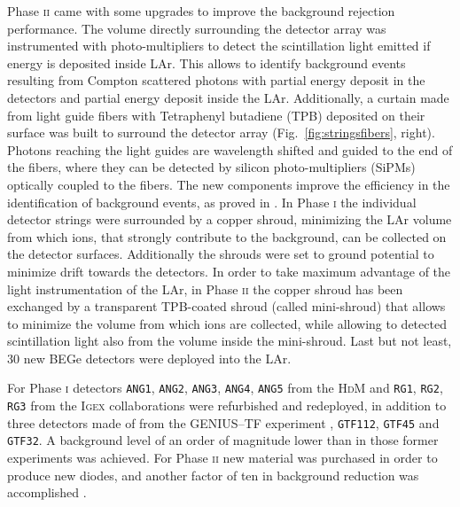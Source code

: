 Phase \textsc{ii} came with some upgrades to improve the background rejection performance. The volume directly surrounding the detector array was instrumented with photo-multipliers to detect the scintillation light emitted if energy is deposited inside LAr. This allows to identify background events resulting from Compton scattered photons with partial energy deposit in the detectors and partial energy deposit inside the LAr. Additionally, a curtain made from light guide fibers with Tetraphenyl butadiene (TPB) deposited on their surface was built to surround the detector array (Fig.~\ref{fig:stringsfibers}, right). Photons reaching the light guides are wavelength shifted and guided to the end of the fibers, where they can be detected by silicon photo-multipliers (SiPMs) optically coupled to the fibers. The new components improve the efficiency in the identification of background events, as proved in \cite{nature}. In Phase \textsc{i} the individual detector strings were surrounded by a copper shroud, minimizing the LAr volume from which  ions, that strongly contribute to the background, can be collected on the detector surfaces. Additionally the shrouds were set to ground potential to minimize drift towards the detectors. In order to take maximum advantage of the light instrumentation of the LAr, in Phase \textsc{ii} the copper shroud has been exchanged by a transparent TPB-coated shroud (called mini-shroud) that allows to minimize the volume from which  ions are collected, while allowing to detected scintillation light also from the volume inside the mini-shroud. Last but not least, 30 new BEGe detectors were deployed into the LAr.

 For Phase \textsc{i} detectors \texttt{ANG1}, \texttt{ANG2}, \texttt{ANG3}, \texttt{ANG4}, \texttt{ANG5} from the \textsc{HdM} \cite{hdm} and \texttt{RG1}, \texttt{RG2}, \texttt{RG3} from the \textsc{Igex} \cite{igex} collaborations were refurbished and redeployed, in addition to three detectors made of  from the GENIUS--TF experiment \cite{genius1, genius2}, \texttt{GTF112}, \texttt{GTF45} and \texttt{GTF32}. A background level of an order of magnitude lower than in those former experiments was achieved. For Phase \textsc{ii} new material was purchased in order to produce new diodes, and another factor of ten in background reduction was accomplished \cite{nature}.

